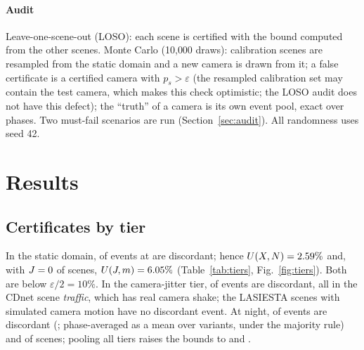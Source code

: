 \paragraph{Audit} Leave-one-scene-out (LOSO): each scene is certified with the bound computed from the other scenes.
Monte Carlo (10{,}000 draws): calibration scenes are resampled from the static domain and a new camera is drawn from it;
a false certificate is a certified camera with $p_s>\varepsilon$ (the resampled calibration set may contain the test
camera, which makes this check optimistic; the LOSO audit does not have this defect); the ``truth'' of a camera is its own event pool,
exact over phases. Two must-fail scenarios are run (Section~\ref{sec:audit}). All randomness uses seed 42.

\section{Results}\label{sec:results}

\subsection{Certificates by tier}
In the static domain, \nMainDw{} of \nMainN{} events at \OPs{} are discordant; hence $U(X,N)=2.59\%$ and,
with $J=0$ of \nMainM{} scenes, $U(J,m)=6.05\%$ (Table~\ref{tab:tiers}, Fig.~\ref{fig:tiers}). Both are
below $\varepsilon/2=10\%$. In the camera-jitter tier, \nJitDw{} of \nJitN{} events are discordant, all in the CDnet
scene \emph{traffic}, which has real camera shake; the LASIESTA scenes with simulated camera motion have no discordant
event. At
night, \nNightDw{} of \nNightN{} events are discordant (\nNightDwPct; phase-averaged \nNightDexp{} as a mean over variants, \nNightDexpMaj{} under the majority rule) and \nNightJ{} of
\nNightScenes{} scenes; pooling all tiers raises the bounds to \nAllUfleet{} and \nAllUpop.

